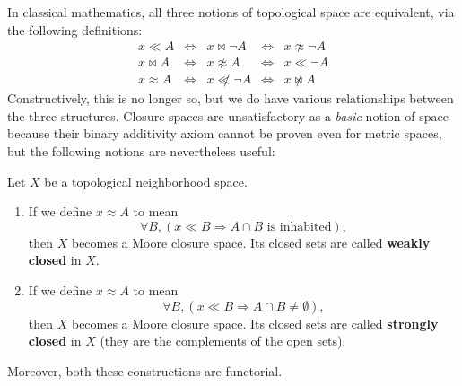 \documentclass{article}
\def\napprox{\not\approx}
\def\cpl#1{\neg #1}
\let\implies\Rightarrow
\begin{document}
In classical mathematics, all three notions of topological space are equivalent, via the following definitions:
\[
\begin{array}{ccccc}
  x\ll A & \iff & x \bowtie \cpl{A} & \iff & x\napprox \cpl{A}\\
  x\bowtie A & \iff & x\napprox A & \iff & x \ll \cpl{A}\\
  x\approx A & \iff & x \not\ll \cpl{A} & \iff & x \not\bowtie A
\end{array}
\]
Constructively, this is no longer so, but we do have various relationships between the three structures.
Closure spaces are unsatisfactory as a \emph{basic} notion of space because their binary additivity axiom cannot be proven even for metric spaces, but the following notions are nevertheless useful:

\begin{thm}\label{thm:top-closed}
  Let $X$ be a topological neighborhood space.
  \begin{enumerate}
  \item If we define $x\approx A$ to mean
    \[\forall B, (x\ll B \implies A\cap B \text{ is inhabited}),\]
    then $X$ becomes a Moore closure space.\label{item:top-ll-wkcl}
    Its closed sets are called \textbf{weakly closed} in $X$.
  \item If we define $x\approx A$ to mean
    \[\forall B, (x\ll B \implies A\cap B \neq \emptyset),\]
    then $X$ becomes a Moore closure space.\label{item:top-ll-strcl}
    Its closed sets are called \textbf{strongly closed} in $X$ (they are the complements of the open sets).
  \end{enumerate}
  Moreover, both these constructions are functorial.
\end{thm}
\end{document}
